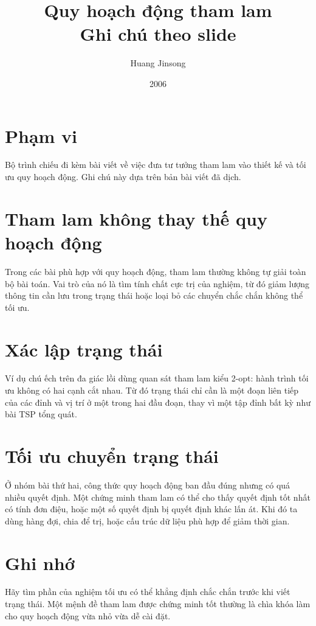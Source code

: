 \documentclass[11pt]{article}
\title{Quy hoạch động tham lam\\{\large Ghi chú theo slide}}
\author{Huang Jinsong}
\date{2006}
\begin{document}
\maketitle


\section{Phạm vi}

Bộ trình chiếu đi kèm bài viết về việc đưa tư tưởng tham lam vào thiết kế và
tối ưu quy hoạch động. Ghi chú này dựa trên bản bài viết đã dịch.

\section{Tham lam không thay thế quy hoạch động}

Trong các bài phù hợp với quy hoạch động, tham lam thường không tự giải toàn
bộ bài toán. Vai trò của nó là tìm tính chất cực trị của nghiệm, từ đó giảm
lượng thông tin cần lưu trong trạng thái hoặc loại bỏ các chuyển chắc chắn
không thể tối ưu.

\section{Xác lập trạng thái}

Ví dụ chú ếch trên đa giác lồi dùng quan sát tham lam kiểu 2-opt: hành trình
tối ưu không có hai cạnh cắt nhau. Từ đó trạng thái chỉ cần là một đoạn liên
tiếp của các đỉnh và vị trí ở một trong hai đầu đoạn, thay vì một tập đỉnh bất
kỳ như bài TSP tổng quát.

\section{Tối ưu chuyển trạng thái}

Ở nhóm bài thứ hai, công thức quy hoạch động ban đầu đúng nhưng có quá nhiều
quyết định. Một chứng minh tham lam có thể cho thấy quyết định tốt nhất có
tính đơn điệu, hoặc một số quyết định bị quyết định khác lấn át. Khi đó ta
dùng hàng đợi, chia để trị, hoặc cấu trúc dữ liệu phù hợp để giảm thời gian.

\section{Ghi nhớ}

Hãy tìm phần của nghiệm tối ưu có thể khẳng định chắc chắn trước khi viết
trạng thái. Một mệnh đề tham lam được chứng minh tốt thường là chìa khóa làm
cho quy hoạch động vừa nhỏ vừa dễ cài đặt.
\end{document}
